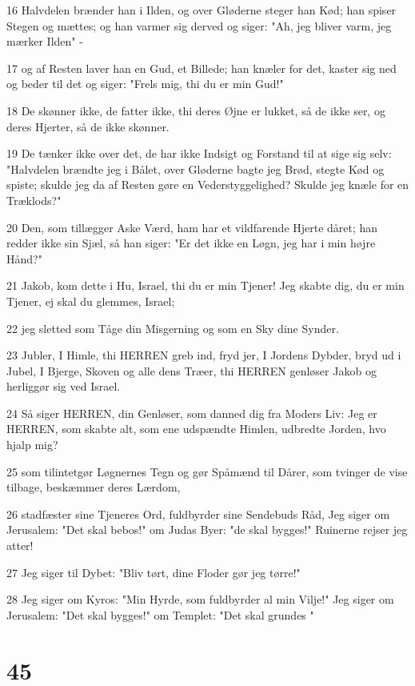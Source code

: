 \par 16 Halvdelen brænder han i Ilden, og over Gløderne steger han Kød; han spiser Stegen og mættes; og han varmer sig derved og siger: "Ah, jeg bliver varm, jeg mærker Ilden" -
\par 17 og af Resten laver han en Gud, et Billede; han knæler for det, kaster sig ned og beder til det og siger: "Frels mig, thi du er min Gud!"
\par 18 De skønner ikke, de fatter ikke, thi deres Øjne er lukket, så de ikke ser, og deres Hjerter, så de ikke skønner.
\par 19 De tænker ikke over det, de har ikke Indsigt og Forstand til at sige sig selv: "Halvdelen brændte jeg i Bålet, over Gløderne bagte jeg Brød, stegte Kød og spiste; skulde jeg da af Resten gøre en Vederstyggelighed? Skulde jeg knæle for en Træklods?"
\par 20 Den, som tillægger Aske Værd, ham har et vildfarende Hjerte dåret; han redder ikke sin Sjæl, så han siger: "Er det ikke en Løgn, jeg har i min højre Hånd?"
\par 21 Jakob, kom dette i Hu, Israel, thi du er min Tjener! Jeg skabte dig, du er min Tjener, ej skal du glemmes, Israel;
\par 22 jeg sletted som Tåge din Misgerning og som en Sky dine Synder.
\par 23 Jubler, I Himle, thi HERREN greb ind, fryd jer, I Jordens Dybder, bryd ud i Jubel, I Bjerge, Skoven og alle dens Træer, thi HERREN genløser Jakob og herliggør sig ved Israel.
\par 24 Så siger HERREN, din Genløser, som danned dig fra Moders Liv: Jeg er HERREN, som skabte alt, som ene udspændte Himlen, udbredte Jorden, hvo hjalp mig?
\par 25 som tilintetgør Løgnernes Tegn og gør Spåmænd til Dårer, som tvinger de vise tilbage, beskæmmer deres Lærdom,
\par 26 stadfæster sine Tjeneres Ord, fuldbyrder sine Sendebuds Råd, Jeg siger om Jerusalem: "Det skal bebos!" om Judas Byer: "de skal bygges!" Ruinerne rejser jeg atter!
\par 27 Jeg siger til Dybet: "Bliv tørt, dine Floder gør jeg tørre!"
\par 28 Jeg siger om Kyros: "Min Hyrde, som fuldbyrder al min Vilje!" Jeg siger om Jerusalem: "Det skal bygges!" om Templet: "Det skal grundes "

\chapter{45}

